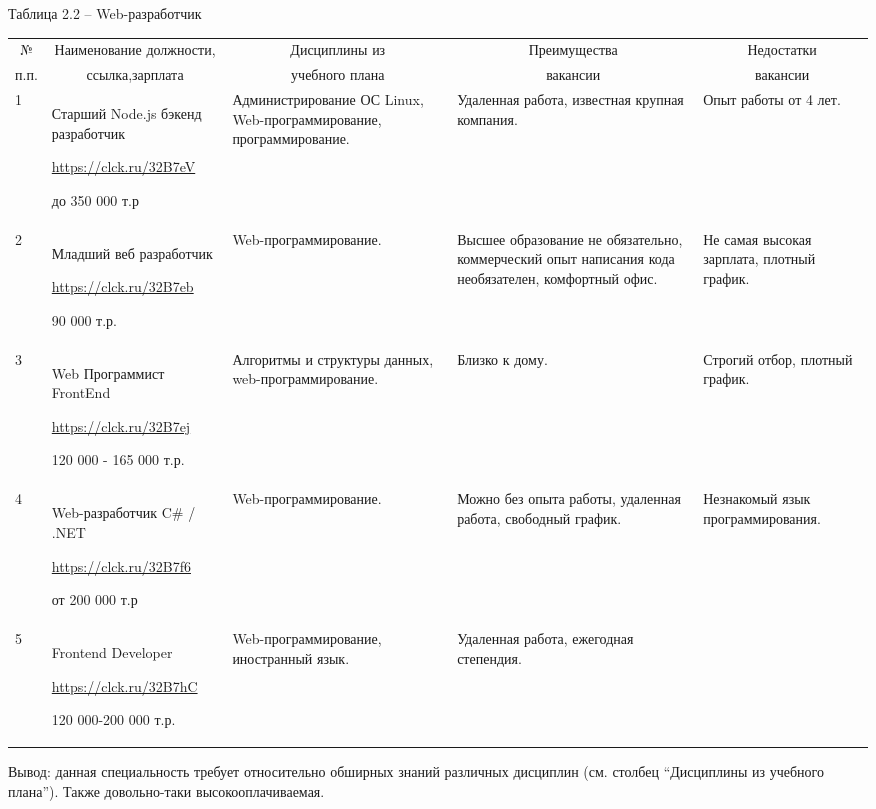 \begin{landscape}
Таблица 2.2 – Web-разработчик
\begin{table}[H]
	\begin{center}
		\begin{small}
		\begin{tabular}{|p{1.1cm}|p{6cm}|p{5.2cm}|p{4cm}|p{4cm}|} \hline
			\multicolumn{1}{|c|}{№}&\multicolumn{1}{c|}{Наименование должности,}&\multicolumn{1}{c|}{Дисциплины из}&\multicolumn{1}{c|}{Преимущества }&\multicolumn{1}{c|}{Недостатки}\\ 
			\multicolumn{1}{|c|}{п.п.}&\multicolumn{1}{c|}{ссылка,зарплата}&\multicolumn{1}{c|}{учебного плана}&\multicolumn{1}{c|}{ вакансии}&\multicolumn{1}{c|}{вакансии}\\ 
			\hline
			1 & Старший Node.js бэкенд разработчик
			
			\url{https://clck.ru/32B7eV}
			
			до 350 000 т.р & Администрирование ОС Linux, Web-программирование, программирование.& Удаленная работа, известная крупная компания.& Опыт работы от 4 лет.\\
			\hline
			2 & Младший веб разработчик
			
			\url{https://clck.ru/32B7eb}
			
			90 000 т.р. & Web-программирование.& Высшее образование не обязательно, коммерческий опыт написания кода необязателен, комфортный офис.& Не самая высокая зарплата, плотный график.\\
			\hline
                3 & Web Программист FrontEnd
			
			\url{https://clck.ru/32B7ej}
			
			120 000 - 165 000 т.р. & Алгоритмы и структуры данных, web-программирование.& Близко к дому.& Строгий отбор, плотный график.\\
			\hline
			4 & Web-разработчик C$\#$ / .NET
			
			\url{https://clck.ru/32B7f6}
			
			от 200 000 т.р & Web-программирование.& Можно без опыта работы, удаленная работа, свободный график.& Незнакомый язык программирования.\\
			\hline
			5 & Frontend Developer
			
			\url{https://clck.ru/32B7hC}
			
			120 000-200 000 т.р. & Web-программирование, иностранный язык.& Удаленная работа, ежегодная степендия.& \\
			\hline
		\end{tabular}
	\end{small}
	\end{center}
\end{table}
Вывод: данная специальность требует относительно обширных знаний различных дисциплин (см. столбец “Дисциплины из учебного плана”). Также довольно-таки высокооплачиваемая.
\end{landscape}

